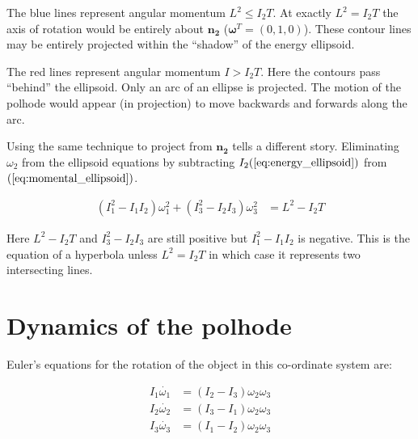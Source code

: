 \documentclass[a4paper, 12pt]{article}
\begin{document}
The blue lines represent angular momentum $L^2\leq I_2T$. At exactly $L^2=I_2T$ the axis of rotation would be entirely about $\bm{n_2}$ ($\bm{\omega}^T=(0, 1, 0)$). These contour lines may be entirely projected within the ``shadow'' of the energy ellipsoid. 

The red lines represent angular momentum $I > I_2T$. Here the contours pass ``behind'' the ellipsoid. Only an arc of an ellipse is projected. The motion of the polhode would appear (in projection) to move backwards and forwards along the arc.

Using the same technique to project from $\bm{n_2}$ tells a different story. Eliminating $\omega_2$ from the ellipsoid equations by subtracting $I_2(\ref{eq:energy_ellipsoid})$ from $(\ref{eq:momental_ellipsoid})$.

\begin{align}
  (I_1^2 - I_1I_2)\omega_1^2 + (I_3^2-I_2I_3)\omega_3^2 & = L^2 - I_2T\label{eq:momell13}
\end{align}

Here $L^2 - I_2T$ and $I_3^2-I_2I_3$ are still positive but $I_1^2 - I_1I_2$ is negative. This is the equation of a hyperbola unless $L^2=I_2T$ in which case it represents two intersecting lines.


\section{Dynamics of the polhode}

Euler's equations for the rotation of the object in this co-ordinate system are:

\begin{align}
  I_1\dot{\omega_1}& =(I_2 - I_3)\omega_2\omega_3 \label{eq:euler1} \\
  I_2\dot{\omega_2}& =(I_3 - I_1)\omega_2\omega_3 \\
  I_3\dot{\omega_3}& =(I_1 - I_2)\omega_2\omega_3 
\end{align}
\end{document}
